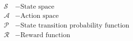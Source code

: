 \documentclass[preview]{standalone}
\begin{document}
\begin{align*}
\mathcal{S} &- \text{State space} \\
            \mathcal{A} &- \text{Action space} \\
            \mathcal{P} &- \text{State transition probability function} \\
            \mathcal{R} &- \text{Reward function} \\
\end{align*}
\end{document}
